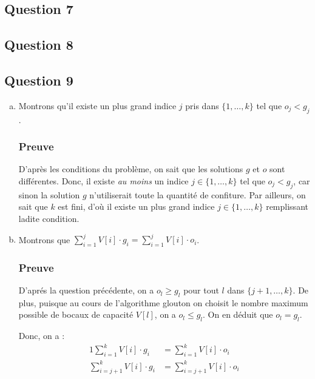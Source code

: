 \documentclass[12pt,a4paper]{article}
\begin{document}
\subsection*{Question 7}

\subsection*{Question 8}

\subsection*{Question 9}
\begin{enumerate}[a)]
 \item Montrons qu'il existe un plus grand indice $j$ pris dans $\{1,\dotsc,k\}$ tel que $o_j < g_j$.
 
 \subsubsection*{Preuve}
 D'apr\`es les conditions du probl\`eme, on sait que les solutions $g$ et $o$ sont diff\'erentes. Donc, il existe {\itshape au moins} un indice $j \in \{1,\dotsc,k\}$ tel que $o_j < g_j$, car sinon la solution $g$ n'utiliserait toute la quantit\'e de confiture. Par ailleurs, on sait que $k$ est fini, d'o\`u il existe un plus grand indice $j \in \{1,\dotsc,k\}$ remplissant ladite condition.
 
 \item Montrons que \( \displaystyle\sum_{i=1}^{j} V[i]\cdot g_i = \displaystyle\sum_{i=1}^{j} V[i]\cdot o_i\).
 
 \subsubsection*{Preuve}
 D'apr\'es la question pr\'ec\'edente, on a $o_l \geq g_l$ pour tout $l$ dans $\{j+1,\dotsc, k\}$. De plus, puisque au cours de l'algorithme glouton on choisit le nombre maximum possible de bocaux de capacit\'e $V[l]$, on a $o_l \leq g_l$. On en d\'eduit que $o_l = g_l$.
 
 Donc, on a :
 \begin{alignat}{1}
    \displaystyle\sum_{i=1}^{k} V[i]\cdot g_i &= \displaystyle\sum_{i=1}^{k} V[i]\cdot o_i \\
    \displaystyle\sum_{i=j+1}^{k} V[i]\cdot g_i &= \displaystyle\sum_{i=j+1}^{k} V[i]\cdot o_i
 \end{alignat}
 

\end{enumerate}
\end{document}
